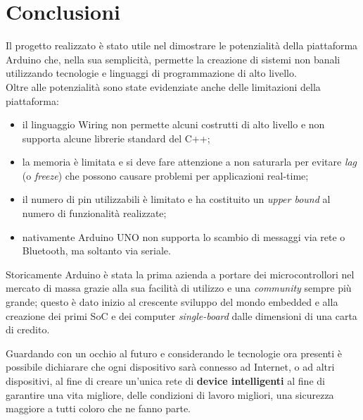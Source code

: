 \chapter{Conclusioni}
Il progetto realizzato è stato utile nel dimostrare le potenzialità della piattaforma Arduino che, nella sua semplicità, permette la creazione di sistemi non banali utilizzando tecnologie e linguaggi di programmazione di alto livello.\\ 
Oltre alle potenzialità sono state evidenziate anche delle limitazioni della piattaforma:
\begin{itemize}
	\item il linguaggio Wiring non permette alcuni costrutti di alto livello e non supporta alcune librerie standard del C++;
	\item la memoria è limitata e si deve fare attenzione a non saturarla per evitare \textit{lag} (o \textit{freeze}) che possono causare problemi per applicazioni real-time;
	\item il numero di pin utilizzabili è limitato e ha costituito un \textit{upper bound} al numero di funzionalità realizzate;
	\item nativamente Arduino UNO non supporta lo scambio di messaggi via rete o Bluetooth, ma soltanto via seriale.
\end{itemize}
Storicamente Arduino è stata la prima azienda a portare dei microcontrollori nel mercato di massa grazie alla sua facilità di utilizzo e una \textit{community} sempre più grande; questo è dato inizio al crescente sviluppo del mondo embedded e alla creazione dei primi SoC e dei computer \textit{single-board} dalle dimensioni di una carta di credito.

Guardando con un occhio al futuro e considerando le tecnologie ora presenti è possibile dichiarare che ogni dispositivo sarà connesso ad Internet, o ad altri dispositivi, al fine di creare un'unica rete di \textbf{device intelligenti} al fine di garantire una vita migliore, delle condizioni di lavoro migliori, una sicurezza maggiore a tutti coloro che ne fanno parte.